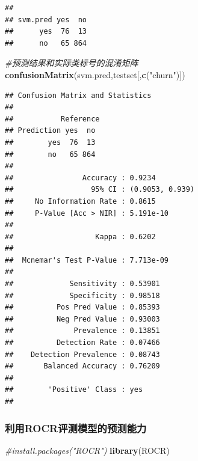 \documentclass[
]{article}
\newenvironment{Shaded}{\begin{snugshade}}{\end{snugshade}}
\newcommand{\CommentTok}[1]{\textcolor[rgb]{0.56,0.35,0.01}{\textit{#1}}}
\newcommand{\KeywordTok}[1]{\textcolor[rgb]{0.13,0.29,0.53}{\textbf{#1}}}
\newcommand{\NormalTok}[1]{#1}
\newcommand{\StringTok}[1]{\textcolor[rgb]{0.31,0.60,0.02}{#1}}
\begin{document}
\begin{verbatim}
##         
## svm.pred yes  no
##      yes  76  13
##      no   65 864
\end{verbatim}

\begin{Shaded}
\begin{Highlighting}[]
\CommentTok{#预测结果和实际类标号的混淆矩阵}
\KeywordTok{confusionMatrix}\NormalTok{(svm.pred,testset[,}\KeywordTok{c}\NormalTok{(}\StringTok{"churn"}\NormalTok{)])}
\end{Highlighting}
\end{Shaded}

\begin{verbatim}
## Confusion Matrix and Statistics
## 
##           Reference
## Prediction yes  no
##        yes  76  13
##        no   65 864
##                                          
##                Accuracy : 0.9234         
##                  95% CI : (0.9053, 0.939)
##     No Information Rate : 0.8615         
##     P-Value [Acc > NIR] : 5.191e-10      
##                                          
##                   Kappa : 0.6202         
##                                          
##  Mcnemar's Test P-Value : 7.713e-09      
##                                          
##             Sensitivity : 0.53901        
##             Specificity : 0.98518        
##          Pos Pred Value : 0.85393        
##          Neg Pred Value : 0.93003        
##              Prevalence : 0.13851        
##          Detection Rate : 0.07466        
##    Detection Prevalence : 0.08743        
##       Balanced Accuracy : 0.76209        
##                                          
##        'Positive' Class : yes            
## 
\end{verbatim}

\hypertarget{ux5229ux7528rocrux8bc4ux6d4bux6a21ux578bux7684ux9884ux6d4bux80fdux529b}{%
\subsubsection{利用ROCR评测模型的预测能力}\label{ux5229ux7528rocrux8bc4ux6d4bux6a21ux578bux7684ux9884ux6d4bux80fdux529b}}

\begin{Shaded}
\begin{Highlighting}[]
\CommentTok{#install.packages("ROCR")}
\KeywordTok{library}\NormalTok{(ROCR)}
\end{Highlighting}
\end{Shaded}
\end{document}
